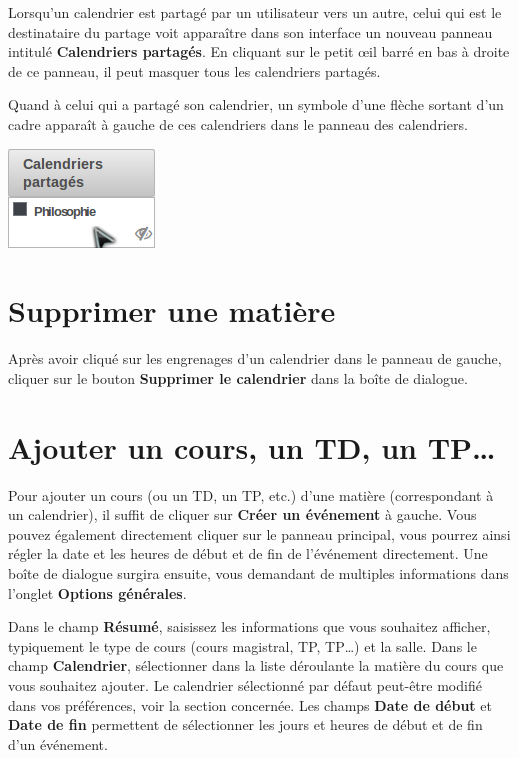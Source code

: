\documentclass[a4paper, 11pt]{report}
\begin{document}
			Lorsqu’un calendrier est partagé par un utilisateur vers un autre, celui qui est le destinataire du partage voit apparaître dans son interface un nouveau panneau intitulé \textbf{Calendriers partagés}. En cliquant sur le petit œil barré en bas à droite de ce panneau, il peut masquer tous les calendriers partagés.

			Quand à celui qui a partagé son calendrier, un symbole d’une flèche sortant d’un cadre apparaît à gauche de ces calendriers dans le panneau des calendriers.

			\begin{center}
				\includegraphics[scale = 1]{calendriers_partages.png}
			\end{center}

		\section{Supprimer une matière}
			Après avoir cliqué sur les engrenages d’un calendrier dans le panneau de gauche, cliquer sur le bouton \textbf{Supprimer le calendrier} dans la boîte de dialogue.

		\section{Ajouter un cours, un TD, un TP…}
			Pour ajouter un cours (ou un TD, un TP, etc.) d’une matière (correspondant à un calendrier), il suffit de cliquer sur \textbf{Créer un événement} à gauche. Vous pouvez également directement cliquer sur le panneau principal, vous pourrez ainsi régler la date et les heures de début et de fin de l’événement directement. Une boîte de dialogue surgira ensuite, vous demandant de multiples informations dans l’onglet \textbf{Options générales}.

			Dans le champ \textbf{Résumé}, saisissez les informations que vous souhaitez afficher, typiquement le type de cours (cours magistral, TP, TP…) et la salle. Dans le champ \textbf{Calendrier}, sélectionner dans la liste déroulante la matière du cours que vous souhaitez ajouter. Le calendrier sélectionné par défaut peut-être modifié dans vos préférences, voir la section concernée. Les champs \textbf{Date de début} et \textbf{Date de fin} permettent de sélectionner les jours et heures de début et de fin d’un événement.
\end{document}
